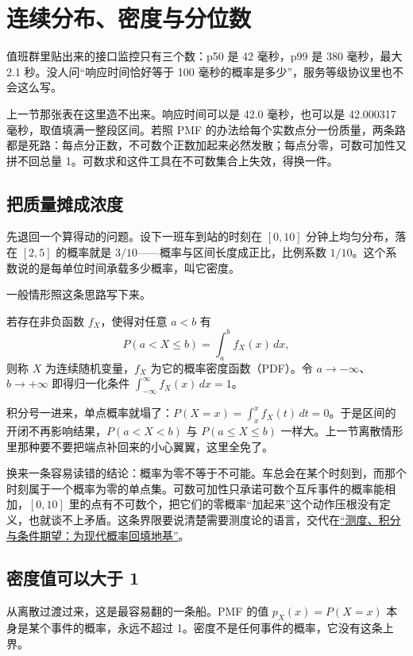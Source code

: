 \section{连续分布、密度与分位数}
\label{sec:05-Probability/03-Random-Variables/03}

值班群里贴出来的接口监控只有三个数：p50 是 42 毫秒，p99 是 380 毫秒，最大 2.1 秒。没人问``响应时间恰好等于 100 毫秒的概率是多少''，服务等级协议里也不会这么写。

上一节那张表在这里造不出来。响应时间可以是 42.0 毫秒，也可以是 42.000317 毫秒，取值填满一整段区间。若照 PMF 的办法给每个实数点分一份质量，两条路都是死路：每点分正数，不可数个正数加起来必然发散；每点分零，可数可加性又拼不回总量 1。可数求和这件工具在不可数集合上失效，得换一件。

\subsection{把质量摊成浓度}

先退回一个算得动的问题。设下一班车到站的时刻在 \([0,10]\) 分钟上均匀分布，落在 \([2,5]\) 的概率就是 \(3/10\)——概率与区间长度成正比，比例系数 \(1/10\)。这个系数说的是每单位时间承载多少概率，叫它密度。

一般情形照这条思路写下来。

\begin{definition}
若存在非负函数 \(f_X\)，使得对任意 \(a<b\) 有
\[
P(a<X\le b)=\int_a^b f_X(x)\,dx,
\]
则称 \(X\) 为连续随机变量，\(f_X\) 为它的概率密度函数（PDF）。令 \(a\to-\infty\)、\(b\to+\infty\) 即得归一化条件 \(\int_{-\infty}^{\infty}f_X(x)\,dx=1\)。
\end{definition}

积分号一进来，单点概率就塌了：\(P(X=x)=\int_x^x f_X(t)\,dt=0\)。于是区间的开闭不再影响结果，\(P(a<X<b)\) 与 \(P(a\le X\le b)\) 一样大。上一节离散情形里那种要不要把端点补回来的小心翼翼，这里全免了。

换来一条容易读错的结论：概率为零不等于不可能。车总会在某个时刻到，而那个时刻属于一个概率为零的单点集。可数可加性只承诺可数个互斥事件的概率能相加，\([0,10]\) 里的点有不可数个，把它们的零概率``加起来''这个动作压根没有定义，也就谈不上矛盾。这条界限要说清楚需要测度论的语言，交代在\hyperref[ch:101]{``测度、积分与条件期望：为现代概率回填地基''}。

\subsection{密度值可以大于 1}

从离散过渡过来，这是最容易翻的一条船。PMF 的值 \(p_X(x)=P(X=x)\) 本身是某个事件的概率，永远不超过 1。密度不是任何事件的概率，它没有这条上界。

